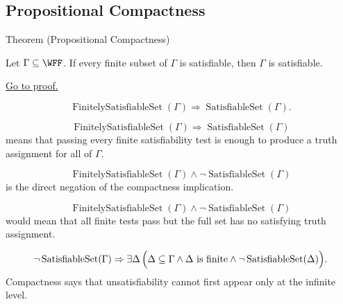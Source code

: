 \subsection*{Propositional Compactness}

\begin{theorembox}{Theorem (Propositional Compactness)}
\begin{theorem}
\label{thm:propositional-compactness}
Let \(\Gamma\subseteq\WFF\). If every finite subset of \(\Gamma\) is
satisfiable, then \(\Gamma\) is satisfiable.

\medskip
\noindent\hyperref[prf:propositional-compactness]{Go to proof.}
\end{theorem}
\end{theorembox}

\begin{remark*}
\[
\operatorname{FinitelySatisfiableSet}(\Gamma)
\Rightarrow
\operatorname{SatisfiableSet}(\Gamma).
\]
\end{remark*}

\begin{remark*}
\[
\operatorname{FinitelySatisfiableSet}(\Gamma)
\Rightarrow
\operatorname{SatisfiableSet}(\Gamma)
\]
means that passing every finite satisfiability test is enough to produce a
truth assignment for all of \(\Gamma\).
\end{remark*}

\begin{remark*}
\[
\operatorname{FinitelySatisfiableSet}(\Gamma)\land
\neg\operatorname{SatisfiableSet}(\Gamma)
\]
is the direct negation of the compactness implication.
\end{remark*}

\begin{remark*}
\[
\operatorname{FinitelySatisfiableSet}(\Gamma)\land
\neg\operatorname{SatisfiableSet}(\Gamma)
\]
would mean that all finite tests pass but the full set has no satisfying truth
assignment.
\end{remark*}

\begin{remark*}
\[
\neg\operatorname{SatisfiableSet}(\Gamma)
\Rightarrow
\exists\Delta\,\Bigl(\Delta\subseteq\Gamma\land \Delta\text{ is finite}\land
\neg\operatorname{SatisfiableSet}(\Delta)\Bigr).
\]
Compactness says that unsatisfiability cannot first appear only at the infinite
level.
\end{remark*}

